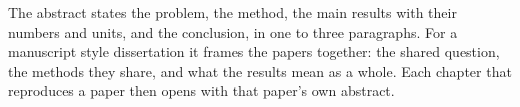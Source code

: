 The abstract states the problem, the method, the main results with their numbers and units, and the conclusion, in one to three paragraphs. For a manuscript style dissertation it frames the papers together: the shared question, the methods they share, and what the results mean as a whole. Each chapter that reproduces a paper then opens with that paper's own abstract.
